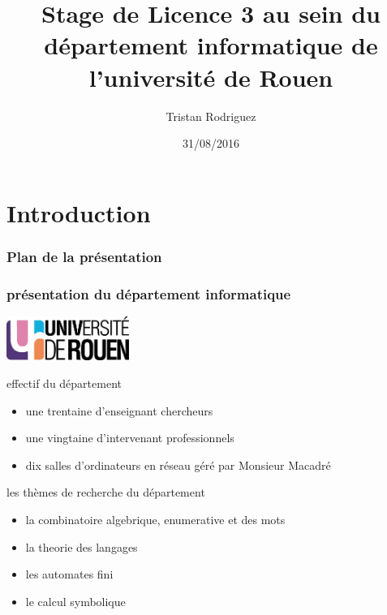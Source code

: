\documentclass{beamer}
\title{Stage de Licence 3 au sein du département informatique de l’université de Rouen}
\author[Tristan Rodriguez]{Tristan Rodriguez}
\institute{Université de Rouen, L3 Info}
\date{31/08/2016}
\begin{document}
  \section{Introduction}
  \label{sec:Introduction}


  \begin{frame}
    \titlepage
  \end{frame}

  \begin{frame}
    \frametitle{Plan de la présentation}
    \tableofcontents
  \end{frame}

  \begin{frame}
    \frametitle{présentation du département informatique}
    
    \begin{center}
      \includegraphics[width=0.3\textwidth, height=0.1\textwidth]{logo_univ.png}  
    \end{center}

    \begin{block} {effectif du département}
      \begin{itemize}
        \item une trentaine d'enseignant chercheurs
        \item une vingtaine d'intervenant professionnels
        \item dix salles d'ordinateurs en réseau géré par Monsieur Macadré
      \end{itemize}
    \end{block}
    
    \pause

    \begin{block} {les thèmes de recherche du département}
      \begin{itemize}
        \item la combinatoire algebrique, enumerative et des mots
        \item la theorie des langages
        \item les automates fini
        \item le calcul symbolique
      \end{itemize}
    \end{block}
  \end{frame}
\end{document}
